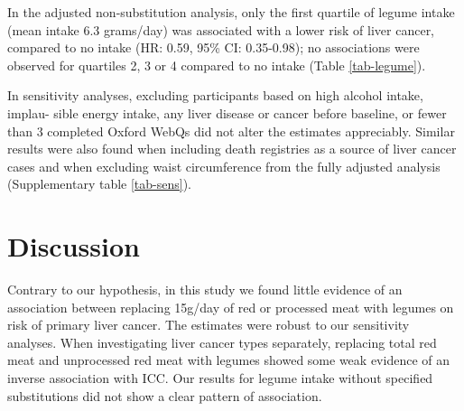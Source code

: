 \documentclass[nutrients,article,submit,moreauthors,pdftex]{Definitions/mdpi}
\begin{document}
In the adjusted non-substitution analysis, only the first quartile of
legume intake (mean intake 6.3 grams/day) was associated with a lower
risk of liver cancer, compared to no intake (HR: 0.59, 95\% CI:
0.35-0.98); no associations were observed for quartiles 2, 3 or 4
compared to no intake (Table \ref{tab-legume}).

In sensitivity analyses, excluding participants based on high alcohol
intake, implau- sible energy intake, any liver disease or cancer before
baseline, or fewer than 3 completed Oxford WebQs did not alter the
estimates appreciably. Similar results were also found when including
death registries as a source of liver cancer cases and when excluding
waist circumference from the fully adjusted analysis (Supplementary
table \ref{tab-sens}).

\hypertarget{sec4}{%
\section{Discussion}\label{sec4}}

Contrary to our hypothesis, in this study we found little evidence of an
association between replacing 15g/day of red or processed meat with
legumes on risk of primary liver cancer. The estimates were robust to
our sensitivity analyses. When investigating liver cancer types
separately, replacing total red meat and unprocessed red meat with
legumes showed some weak evidence of an inverse association with ICC.
Our results for legume intake without specified substitutions did not
show a clear pattern of association.
\end{document}
